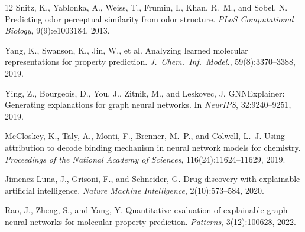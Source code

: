 \documentclass[11pt,a4paper]{article}
\begin{document}
\begin{thebibliography}{12}
Snitz, K., Yablonka, A., Weiss, T., Frumin, I., Khan, R.~M., and Sobel, N.
\newblock Predicting odor perceptual similarity from odor structure.
\newblock \textit{PLoS Computational Biology}, 9(9):e1003184, 2013.

Yang, K., Swanson, K., Jin, W., et al.
\newblock Analyzing learned molecular representations for property prediction.
\newblock \textit{J.~Chem.~Inf.~Model.}, 59(8):3370--3388, 2019.

Ying, Z., Bourgeois, D., You, J., Zitnik, M., and Leskovec, J.
\newblock GNNExplainer: Generating explanations for graph neural networks.
\newblock In \textit{NeurIPS}, 32:9240--9251, 2019.

McCloskey, K., Taly, A., Monti, F., Brenner, M.~P., and Colwell, L.~J.
\newblock Using attribution to decode binding mechanism in neural network models for chemistry.
\newblock \textit{Proceedings of the National Academy of Sciences}, 116(24):11624--11629, 2019.

Jimenez-Luna, J., Grisoni, F., and Schneider, G.
\newblock Drug discovery with explainable artificial intelligence.
\newblock \textit{Nature Machine Intelligence}, 2(10):573--584, 2020.

Rao, J., Zheng, S., and Yang, Y.
\newblock Quantitative evaluation of explainable graph neural networks for molecular property prediction.
\newblock \textit{Patterns}, 3(12):100628, 2022.

\end{thebibliography}
\end{document}

